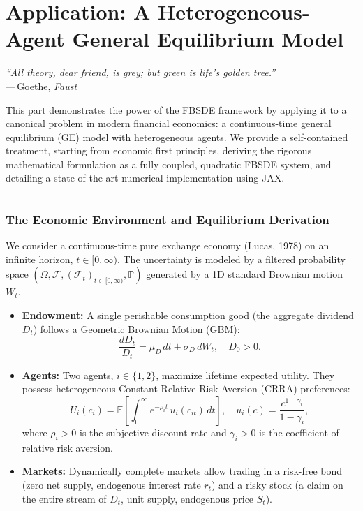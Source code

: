 \clearpage
\newpage
\part{Application: A Heterogeneous-Agent General Equilibrium Model}
\label{part:finance}

\begin{center}
\textit{“All theory, dear friend, is grey; but green is life's golden tree.”}\\
—\,Goethe, \emph{Faust}
\end{center}

This part demonstrates the power of the FBSDE framework by applying it to a canonical problem in modern financial economics: a continuous-time general equilibrium (GE) model with heterogeneous agents. We provide a self-contained treatment, starting from economic first principles, deriving the rigorous mathematical formulation as a fully coupled, quadratic FBSDE system, and detailing a state-of-the-art numerical implementation using JAX.

\bigskip
\hrule
\bigskip

\section{The Economic Environment and Equilibrium Derivation}
\label{sec:lucas_spec_new}

\begin{definition}
We consider a continuous-time pure exchange economy (Lucas, 1978) on an infinite horizon, \(t \in [0, \infty)\). The uncertainty is modeled by a filtered probability space \((\Omega,\mathcal F,(\mathcal F_t)_{t \in [0,\infty)},\mathbb P)\) generated by a 1D standard Brownian motion \(W_t\).
\begin{itemize}[leftmargin=1.6em]
\item \textbf{Endowment:} A single perishable consumption good (the aggregate dividend \(D_t\)) follows a Geometric Brownian Motion (GBM):
    \begin{equation}\label{eq:dividend_SDE_new_main}
      \frac{dD_t}{D_t} = \mu_D\,dt + \sigma_D\,dW_t, \quad D_0 > 0.
    \end{equation}
\item \textbf{Agents:} Two agents, \(i \in \{1, 2\}\), maximize lifetime expected utility. They possess heterogeneous Constant Relative Risk Aversion (CRRA) preferences:
    \begin{equation}\label{eq:utility_new_main}
      U_i(c_i) = \mathbb{E}\left[\int_0^\infty e^{-\rho_i t}\, u_i(c_{it})\,dt\right], \quad u_i(c) = \frac{c^{1-\gamma_i}}{1-\gamma_i},
    \end{equation}
    where \(\rho_i>0\) is the subjective discount rate and \(\gamma_i>0\) is the coefficient of relative risk aversion.
\item \textbf{Markets:} Dynamically complete markets allow trading in a risk-free bond (zero net supply, endogenous interest rate \(r_t\)) and a risky stock (a claim on the entire stream of \(D_t\), unit supply, endogenous price \(S_t\)).
\end{itemize}
\end{definition}

